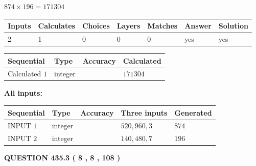 \documentclass{ctexart}
\begin{document}
 

$ %
874 \times  %
196=   %
171304$
 
 
\noindent{}
 
 

 
   
   
   
   
\noindent\begin{tabular}{|l|l|l|l|l|l|l|}
 \hline
Inputs & Calculates & Choices & Layers & Matches & Answer & Solution \\ \hline
 2  & 
 1  & 
 0
  & 
 0  & 
 0  & 
  yes & 
  yes 
  \\ \hline
 \end{tabular}
   
   
   
   
\noindent{}
   
   
  
  
\noindent\begin{tabular}{|l|l|l|l|}
\hline
 Sequential & Type & Accuracy & Calculated \\ 
\hline
 
 
  Calculated $  1 $ & integer &  & 
  $ 171304 $ 
 \\  \hline  
 \end{tabular}
   
   
   
   
\noindent\vspace{0.1in}\hspace{-0.08in} {\textbf{\Large{All inputs: }}}
   
   
  
  
\noindent\begin{tabular}{|l|l|l|l|l|}
\hline
 Sequential & Type & Accuracy & Three inputs & Generated \\ 
\hline
 
 
  INPUT $  1 $ & integer &  & $
 520
 , 
 960
 , 
 3
 $ & $ 874 $ 
 \\  \hline  
 
 
  INPUT $  2 $ & integer &  & $
 140
 , 
 480
 , 
 7
 $ & $ 196 $ 
 \\  \hline  
 \end{tabular}
   
   
  
\vspace{0.2in}
  
{\textbf{\Large{QUESTION
435.3 
 ( 8 , 8 , 108 )
}}}
  
\end{document}
